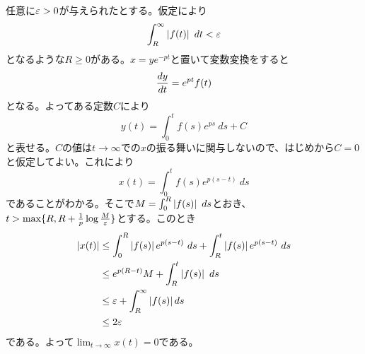 \subsubsection{} %
\begin{sol}
  任意に${\varepsilon} > 0$が与えられたとする。仮定により
  \[
  \int_R^{\infty}  \left \lvert f(t) \right \rvert \ dt < {\varepsilon}
  \]
  となるような$R \geq 0$がある。$x = y e^{-pt}$と置いて変数変換をすると
  \[
  \frac{dy}{dt} = e^{pt}f(t)
  \]
  となる。よってある定数$C$により
  \[
  y(t) = \int_0^t f(s)e^{ps} \ ds + C
  \]
と表せる。$C$の値は$t \to \infty$での$x$の振る舞いに関与しないので、はじめから$C=0$と仮定してよい。これにより
\[
x(t) =   \int_0^t f(s)e^{p(s-t)} \ ds
\]
であることがわかる。そこで$M =  \int_0^R \left \lvert f(s) \right \rvert \ ds $とおき、$ t > \max \{ R, R+ \frac{1}{p} \log \frac{M}{{\varepsilon}} \}$とする。このとき
\begin{align*}
  \left \lvert x(t) \right \rvert &\leq \int_0^R \left \lvert f(s) \right \rvert e^{p(s-t)} \ ds  + \int_R^t \left \lvert f(s) \right \rvert e^{p(s-t)} \ ds  \\
  &\leq e^{p(R-t)} M + \int_R^t \left \lvert f(s) \right \rvert \ ds  \\
  &\leq {\varepsilon}  + \int_R^{\infty} \left \lvert f(s) \right \rvert  ds \\
  &\leq 2{\varepsilon}
\end{align*}
である。よって$\lim_{t \to \infty} x(t) = 0$である。
\end{sol}



\newpage





